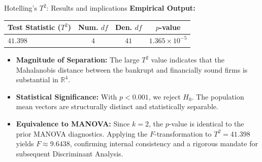 \documentclass[8pt, aspectratio=169]{beamer}
\begin{document}
\begin{frame}{Hotelling’s $T^2$: Results and implications}
    \textbf{Empirical Output:}
    \begin{table}
        \centering
        \begin{tabular}{l c c c}
            \toprule
            \textbf{Test Statistic ($T^2$)} & \textbf{Num. $df$} & \textbf{Den. $df$} & \textbf{$p$-value} \\
            \midrule
            $41.398$ & $4$ & $41$ & $1.365 \times 10^{-5}$ \\
            \bottomrule
        \end{tabular}
    \end{table}

    \vspace{0.3cm}

    \begin{itemize}
        \item \textbf{Magnitude of Separation:} The large $T^2$ value indicates that the Mahalanobis distance between the bankrupt and financially sound firms is substantial in $\mathbb{R}^4$.
        \item \textbf{Statistical Significance:} With $p < 0.001$, we reject $H_0$. The population mean vectors are structurally distinct and statistically separable.
        \item \textbf{Equivalence to MANOVA:} Since $k=2$, the $p$-value is identical to the prior MANOVA diagnostics. Applying the $F$-transformation to $T^2 = 41.398$ yields $F \approx 9.6438$, confirming internal consistency and a rigorous mandate for subsequent Discriminant Analysis.
    \end{itemize}
\end{frame}
\end{document}
